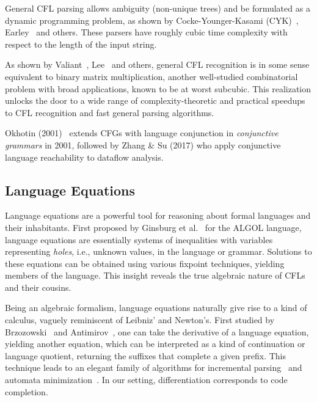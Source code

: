 \documentclass[sigplan,review,anonymous,acmsmall]{acmart}\settopmatter{printfolios=false,printccs=false,printacmref=false}
\begin{document}
General CFL parsing allows ambiguity (non-unique trees) and be formulated as a dynamic programming problem, as shown by Cocke-Younger-Kasami (CYK)~\cite{sakai1961syntax}, Earley~\cite{earley1970efficient} and others. These parsers have roughly cubic time complexity with respect to the length of the input string.

As shown by Valiant~\cite{valiant1975general}, Lee~\cite{lee2002fast} and others, general CFL recognition is in some sense equivalent to binary matrix multiplication, another well-studied combinatorial problem with broad applications, known to be at worst subcubic. This realization unlocks the door to a wide range of complexity-theoretic and practical speedups to CFL recognition and fast general parsing algorithms.

Okhotin (2001)~\cite{okhotin2001conjunctive} extends CFGs with language conjunction in \textit{conjunctive grammars} in 2001, followed by Zhang \& Su (2017) who apply conjunctive language reachability to dataflow analysis.



\subsection{Language Equations}

Language equations are a powerful tool for reasoning about formal languages and their inhabitants. First proposed by Ginsburg et al.~\cite{ginsburg1962two} for the ALGOL language, language equations are essentially systems of inequalities with variables representing \textit{holes}, i.e., unknown values, in the language or grammar. Solutions to these equations can be obtained using various fixpoint techniques, yielding members of the language. This insight reveals the true algebraic nature of CFLs and their cousins.

Being an algebraic formalism, language equations naturally give rise to a kind of calculus, vaguely reminiscent of Leibniz' and Newton's. First studied by Brzozowski~\cite{brzozowski1964derivatives, brzozowski1980equations} and Antimirov~\cite{antimirov1996partial}, one can take the derivative of a language equation, yielding another equation, which can be interpreted as a kind of continuation or language quotient, returning the suffixes that complete a given prefix. This technique leads to an elegant family of algorithms for incremental parsing~\cite{might2011parsing, adams2016complexity} and automata minimization~\cite{brzozowski1962canonical}. In our setting, differentiation corresponds to code completion.
\end{document}
